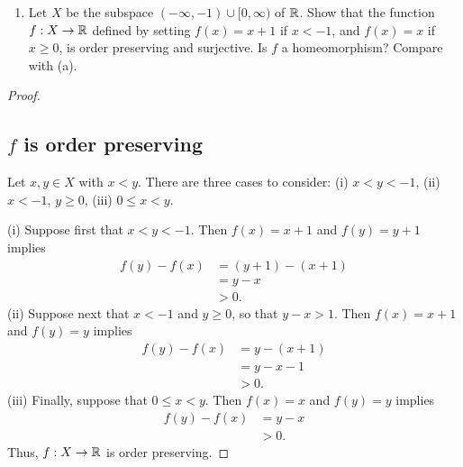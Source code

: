 \begin{solution}
  \begin{enumerate}[label={(\alph*)}, align=left, leftmargin=\parindent, listparindent=\parindent, labelwidth=0pt, itemindent=!]
    \addtocounter{enumi}{2} 
    \item 
      Let $X$ be the subspace $(-\infty, -1) \cup [0, \infty)$ of $\mathbb{R}$.
      Show that the function $f: X \rightarrow \mathbb{R}$ defined by setting $f(x) = x + 1$ if $x < -1$, and $f(x) = x$ if $x \geq 0$, is order preserving and surjective.
      Is $f$ a homeomorphism?
      Compare with (a).
  \end{enumerate}
  \begin{proof}~

    \subsection*{$f$ is order preserving}
    Let $x, y \in X$ with $x < y$.
    There are three cases to consider: (i) $x < y < -1$, (ii) $x < -1$, $y \geq 0$, (iii) $0 \leq x < y$.

    (i) Suppose first that $x < y < -1$.
    Then $f(x) = x + 1$ and $f(y) = y + 1$ implies
    \begin{equation*}
      \begin{aligned}
        f(y) - f(x) &= (y + 1) - (x + 1) \\
                    &= y - x \\
                    &> 0.
      \end{aligned}
    \end{equation*}
    (ii) Suppose next that $x < -1$ and $y \geq 0$, so that $y - x > 1$.
    Then $f(x) = x + 1$ and $f(y) = y$ implies
    \begin{equation*}
      \begin{aligned}
        f(y) - f(x) &= y - (x + 1) \\
                    &= y - x - 1 \\
                    &> 0.
      \end{aligned}
    \end{equation*}
    (iii) Finally, suppose that $0 \leq x < y$.
    Then $f(x) = x$ and $f(y) = y$ implies
    \begin{equation*}
      \begin{aligned}
        f(y) - f(x) &= y - x \\
                    &> 0.
      \end{aligned}
    \end{equation*}
    Thus, $f: X \rightarrow \mathbb{R}$ is order preserving.


\end{proof}
\end{solution}
